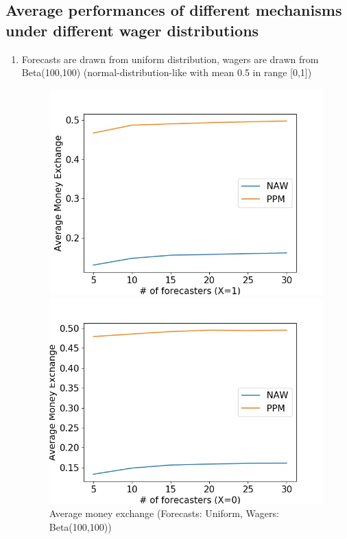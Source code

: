 \documentclass[english,10pt]{article}
\begin{document}
\subsection{Average performances of different mechanisms under different wager distributions}
	\begin{enumerate}
	\item Forecasts are drawn from uniform distribution, wagers are drawn from Beta(100,100) (normal-distribution-like with mean 0.5 in range [0,1])
	\begin{figure}[H]
        	\centering
        	\begin{minipage}{0.48\textwidth}
        	\includegraphics[width = \textwidth]{(UnifF_Beta(100_100)W)Avg_MnEx(X=1).jpg}
        	\end{minipage}
        	\begin{minipage}{0.48\textwidth}
        	\includegraphics[width = \textwidth]{(UnifF_Beta(100_100)W)Avg_MnEx(X=0).jpg}
        	\end{minipage}
        	\caption{Average money exchange (Forecasts: Uniform, Wagers: Beta(100,100))}
        	\end{figure}
	

\end{enumerate}
\end{document}
